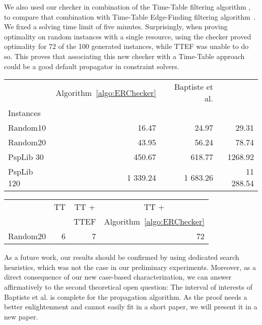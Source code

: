 \documentclass{llncs}
\begin{document}
We also used our checker in combination of the Time-Table filtering algorithm \cite{Letort:ScalableSweep}, to compare that combination with Time-Table Edge-Finding filtering algorithm~\cite{Vilim2011TTEF}.  
We fixed a solving time limit of five minutes. 
Surprisingly, when proving optimality on random instances with a single resource, using the checker proved optimality for 72 of the 100 generated instances, while TTEF was unable to do so. 
This proves that associating this new checker with a Time-Table approach could be a good default propagator in constraint solvers. 
\vspace{-0.5cm}
\begin{table}[!ht]
{\scriptsize
\begin{minipage}{.5\textwidth}
\centering
\begin{tabular}{|l|r|r|r|}\cline{2-4}
\multicolumn{1}{r|}{}& Algorithm~\ref{algo:ERChecker} & Baptiste et al. & \\
\multicolumn{1}{l|}{Instances} &  &  &  \\ \hline
Random10 &16.47&24.97&29.31\\ 
Random20 &43.95&56.24&78.74\\ \hline
PspLib 30 &450.67&618.77&1268.92\\ 
PspLib 120 &1 339.24&1 683.26&11 288.54\\ \hline
\end{tabular}
\end{minipage}
\begin{minipage}{.5\textwidth}
\centering
\begin{tabular}{|l|r|r|r|}\cline{2-4}
\multicolumn{1}{r|}{}&\multicolumn{1}{c|}{TT}  &\multicolumn{1}{c|}{TT + }&\multicolumn{1}{c|}{TT +} \\
\multicolumn{1}{l|}{} &  & TTEF & Algorithm~\ref{algo:ERChecker}  \\ \hline
Random20 &6&7&72\\ \hline
\end{tabular}
\end{minipage}
}
\end{table}

\vspace{-1.1cm}
As a future work, our results should be confirmed by using dedicated search heuristics, which was not the case in our preliminary experiments. 
Moreover, as a direct consequence of our new case-based characterization, we can answer affirmatively to the second theoretical open question: The interval of interests of Baptiste et al. is complete for the propagation algorithm. As the proof needs a better enlightenment 
and cannot easily fit in a short paper, we will present it in a new paper. 
\linespread{0.96}

\end{document}

